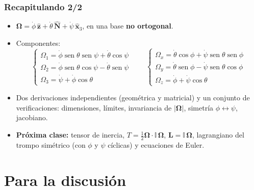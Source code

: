 \documentclass[spanish]{beamer}
\providecommand{\sen}{\operatorname{sen}}       %
\newcommand{\vect}[1]{\mathbf{#1}}              %
\newcommand{\uv}[1]{\hat{\mathbf{#1}}}          %
\newcommand{\bOmega}{\bm{\Omega}}               %
\newcommand{\Inercia}{\mathbb{I}}               %
\begin{document}
\begin{frame}
  \frametitle{Recapitulando 2/2}
  \begin{itemize}
    \item<1-> $\bOmega=\dot\phi\,\uv{z}+\dot\theta\,\uv{N}+\dot\psi\,\uv{x}_3$, en una base
          \textbf{no ortogonal}.
    \item<2-> Componentes:
      {\small
      \[
        \begin{cases}
          \Omega_1=\dot\phi\sen\theta\sen\psi+\dot\theta\cos\psi\\
          \Omega_2=\dot\phi\sen\theta\cos\psi-\dot\theta\sen\psi\\
          \Omega_3=\dot\psi+\dot\phi\cos\theta
        \end{cases}
        \qquad
        \begin{cases}
          \Omega_x=\dot\theta\cos\phi+\dot\psi\sen\theta\sen\phi\\
          \Omega_y=\dot\theta\sen\phi-\dot\psi\sen\theta\cos\phi\\
          \Omega_z=\dot\phi+\dot\psi\cos\theta
        \end{cases}
      \]}
    \item<3-> Dos derivaciones independientes (geométrica y matricial) y un conjunto
          de verificaciones: dimensiones, límites, invariancia de $|\bOmega|$,
          simetría $\phi\leftrightarrow\psi$, jacobiano.
    \item<4-> \textbf{Próxima clase:} tensor de inercia,
          $T=\tfrac12\bOmega\cdot\Inercia\,\bOmega$, $\vect{L}=\Inercia\,\bOmega$,
          lagrangiano del trompo simétrico (con $\phi$ y $\psi$ cíclicas) y
          ecuaciones de Euler.
  \end{itemize}
\end{frame}

\section{Para la discusión}
\end{document}
